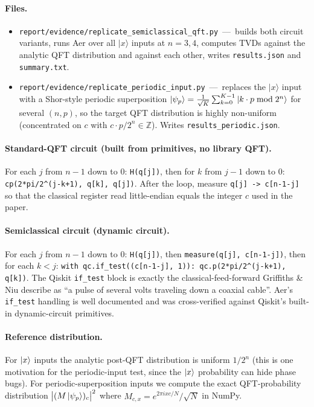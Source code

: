 \documentclass[11pt,letterpaper]{article}
\begin{document}
\paragraph{Files.}
\begin{itemize}
\item \texttt{report/evidence/replicate\_semiclassical\_qft.py}\ ---\ builds both
      circuit variants, runs Aer over all $|x\rangle$ inputs at $n{=}3,4$,
      computes TVDs against the analytic QFT distribution and against each other,
      writes \texttt{results.json} and \texttt{summary.txt}.
\item \texttt{report/evidence/replicate\_periodic\_input.py}\ ---\ replaces the
      $|x\rangle$ input with a Shor-style periodic superposition
      $\ket{\psi_p}=\frac{1}{\sqrt K}\sum_{k=0}^{K-1}\ket{k\cdot p\bmod 2^n}$ for
      several $(n,p)$, so the target QFT distribution is highly non-uniform
      (concentrated on $c$ with $c\cdot p/2^n\in\mathbb{Z}$). Writes
      \texttt{results\_periodic.json}.
\end{itemize}

\paragraph{Standard-QFT circuit (built from primitives, no library QFT).}
For each $j$ from $n-1$ down to $0$: \verb|H(q[j])|, then for $k$ from $j-1$
down to $0$: \verb|cp(2*pi/2^(j-k+1), q[k], q[j])|. After the loop, measure
\verb|q[j] -> c[n-1-j]| so that the classical register read little-endian equals
the integer $c$ used in the paper.

\paragraph{Semiclassical circuit (dynamic circuit).}
For each $j$ from $n-1$ down to $0$: \verb|H(q[j])|, then \verb|measure(q[j], c[n-1-j])|,
then for each $k<j$: \verb|with qc.if_test((c[n-1-j], 1)): qc.p(2*pi/2^(j-k+1), q[k])|.
The Qiskit \texttt{if\_test} block is exactly the classical-feed-forward
Griffiths \& Niu describe as ``a pulse of several volts traveling down a
coaxial cable''. Aer's \texttt{if\_test} handling is well documented and
was cross-verified against Qiskit's built-in dynamic-circuit primitives.

\paragraph{Reference distribution.}
For $\ket{x}$ inputs the analytic post-QFT distribution is uniform
$1/2^n$ (this is one motivation for the periodic-input test, since the
$\ket{x}$ probability can hide phase bugs). For periodic-superposition
inputs we compute the exact QFT-probability distribution
$\bigl|(M\ket{\psi_p})_c\bigr|^2$ where $M_{c,x}=e^{2\pi i x c/N}/\sqrt N$ in
NumPy.
\end{document}
